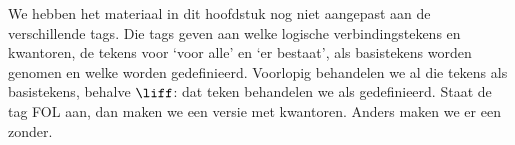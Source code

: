 \documentclass[openany]{memoir}
\begin{document}
\begingroup
\def\olfilename{OLP-0112}
\def\olfilepath{content/first-order-logic/axiomatic-deduction/}
\hypertarget{unit-OLP-0112}{}



      {}
      {}

\begin{editorial}
  We hebben het materiaal in dit hoofdstuk nog niet aangepast aan de
  verschillende tags. Die tags geven aan welke logische verbindingstekens
  en kwantoren, de tekens voor `voor alle' en `er bestaat', als basistekens
  worden genomen en welke worden gedefinieerd. Voorlopig behandelen we al
  die tekens als basistekens, behalve $\liff$: dat teken behandelen we als
  gedefinieerd. Staat de tag FOL aan, dan maken we een versie met
  kwantoren. Anders maken we er een zonder.
\end{editorial}













\endgroup

\begingroup
\def\olfilename{OLP-0113}
\def\olfilepath{content/first-order-logic/axiomatic-deduction/}
\hypertarget{unit-OLP-0113}{}



      {}
      {}
\end{document}
